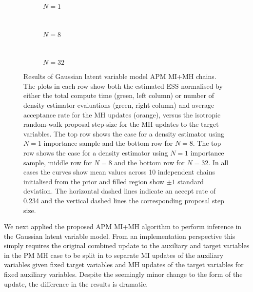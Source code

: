 \begin{figure}
\centering
\begin{subfigure}[b]{\linewidth}
\centering
  \caption{$N=1$}
  \label{sfig:apm-mi-mh-1-gaussian-latent}
\end{subfigure}
\\[3mm]
\begin{subfigure}[b]{\linewidth}
\centering
  \caption{$N=8$}
  \label{sfig:apm-mi-mh-8-gaussian-latent}
\end{subfigure}
\\[3mm]
\begin{subfigure}[b]{\linewidth}
\centering
  \caption{$N=32$}
  \label{sfig:apm-mi-mh-32-gaussian-latent}
\end{subfigure}
\caption[\acs{APM} \acs{MI}+\acs{MH} Gaussian model results.]{
Results of Gaussian latent variable model \acs{APM} \acs{MI}+\acs{MH} chains. The plots in each row show both the estimated \ac{ESS} normalised by either the total compute time (green, left column) or number of density estimator evaluations (green, right column) and average acceptance rate for the \ac{MH} updates (orange), versus the isotropic random-walk proposal step-size for the \ac{MH} updates to the target variables. The top row shows the case for a density estimator using $N=1$ importance sample and the bottom row for $N=8$. The top row shows the case for a density estimator using $N=1$ importance sample, middle row for $N=8$ and the bottom row for $N=32$. In all cases the curves show mean values across 10 independent chains initialised from the prior and filled region show $\pm 1$ standard deviation. The horizontal dashed lines indicate an accept rate of 0.234 and the vertical dashed lines the corresponding proposal step size.}
\label{fig:apm-mi-mh-gaussian-latent-results}
\end{figure}

We next applied the proposed \ac{APM} \ac{MI}+\ac{MH} algorithm to perform inference in the Gaussian latent variable model. From an implementation perspective this simply requires the original combined update to the auxiliary and target variables in the \ac{PM} \ac{MH} case to be split in to separate \ac{MI} updates of the auxiliary variables given fixed target variables and \ac{MH} updates of the target variables for fixed auxiliary variables. Despite the seemingly minor change to the form of the update, the difference in the results is dramatic.

